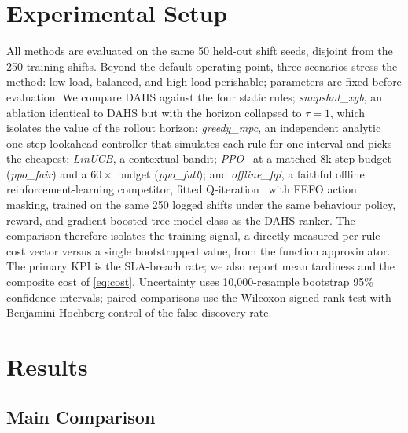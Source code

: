 \documentclass[conference]{IEEEtran}
\begin{document}
\section{Experimental Setup}
\label{sec:setup}

All methods are evaluated on the same 50 held-out shift seeds, disjoint from the
250 training shifts. Beyond the default operating point, three scenarios stress the
method: low load, balanced, and high-load-perishable; parameters are fixed before
evaluation. We compare DAHS against the four static rules; \emph{snapshot\_xgb}, an
ablation identical to DAHS but with the horizon collapsed to $\tau = 1$, which
isolates the value of the rollout horizon; \emph{greedy\_mpc}, an independent
analytic one-step-lookahead controller that simulates each rule for one interval
and picks the cheapest; \emph{LinUCB}, a contextual bandit;
\emph{PPO}~\cite{schulman2017ppo} at a matched 8k-step budget (\emph{ppo\_fair})
and a $60\times$ budget (\emph{ppo\_full}); and \emph{offline\_fqi}, a faithful
offline reinforcement-learning competitor, fitted Q-iteration~\cite{ernst2005fqi}
with FEFO action masking, trained on the same 250 logged shifts under the same
behaviour policy, reward, and gradient-boosted-tree model class as the DAHS ranker.
The comparison therefore isolates the training signal, a directly measured per-rule
cost vector versus a single bootstrapped value, from the function approximator. The
primary KPI is the SLA-breach rate; we also report mean tardiness and the composite
cost of \eqref{eq:cost}. Uncertainty uses 10{,}000-resample bootstrap 95\%
confidence intervals; paired comparisons use the Wilcoxon signed-rank test with
Benjamini-Hochberg control of the false discovery rate.

\section{Results}
\label{sec:results}

\subsection{Main Comparison}
\label{sec:main}
\end{document}
